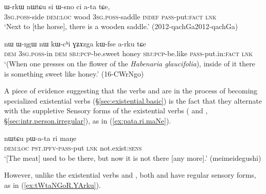 \begin{exe}
\ex \label{ex:Wsno.ata}
 \gll ɯ-rkɯ nɯtɕu si ɯ-sno ci a-ta tɕe, \\
\textsc{3sg}.\textsc{poss}-side \textsc{dem}:\textsc{loc} wood \textsc{3sg}.\textsc{poss}-saddle \textsc{indef} \textsc{pass}-put:\textsc{fact} \textsc{lnk} \\
\glt `Next to [the horse], there is a wooden saddle.' (2012-qachGa2012-qachGa) 
\end{exe}

\begin{exe}
\ex \label{ex:WNgW.arku}
 \gll %
 nɯ ɯ-ŋgɯ nɯ kɯ-cʰi ɣʑɤzga kɯ-fse a-rku tɕe \\
 \textsc{dem} \textsc{3sg}.\textsc{poss}-in \textsc{dem} \textsc{sbj}:\textsc{pcp}-be.sweet honey \textsc{sbj}:\textsc{pcp}-be.like \textsc{pass}-put.in:\textsc{fact} \textsc{lnk} \\
 \glt `(When one presses on the flower of the \textit{Habenaria glaucifolia}), inside of it there is something sweet like honey.' (16-CWrNgo) 
  \end{exe}

A piece of evidence suggesting that the verbs   and  are in the process of becoming specialized existential verbs (§\ref{sec:existential.basic}) is the fact that they alternate with the suppletive Sensory forms of the existential verbs ( and , §\ref{sec:intr.person.irregular}), as in (\ref{ex:pata.ri.maNe}). 

\begin{exe}
\ex \label{ex:pata.ri.maNe}
 \gll nɯtɕu pɯ-a-ta ri maŋe \\
 \textsc{dem}:\textsc{loc} \textsc{pst}.\textsc{ipfv}-\textsc{pass}-put \textsc{lnk} not.exist:\textsc{sens} \\
\glt `[The meat] used to be there, but now it is not there [any more].' (meimeidegushi)
  \end{exe}

However, unlike the existential verbs  and , both    and  have regular sensory forms, as in (\ref{ex:tWtaNGoR.YArku}).

